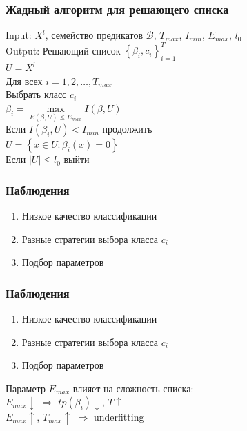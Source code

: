 \documentclass[12pt]{beamer}
\begin{document}
\begin{frame}\frametitle{Жадный алгоритм для решающего списка}
Input: $X^l$, семейство предикатов $\mathcal{B}$, $T_{max}$, $I_{min}$, $E_{max}$, $l_0$\\
Output: Решающий список $\left\{ \beta_i, c_i \right\}_{i=1}^T$\\
\vspace{5mm}
$U = X^l$\\
Для всех $i = 1,2,\dots,T_{max}$\\
\hspace{10mm} Выбрать класс $c_i$\\
\hspace{10mm} $\beta_i = \max\limits_{E(\beta, U) \leq E_{max}} I(\beta, U)$\\
\hspace{10mm} Если $I(\beta_i, U) < I_{min}$ продолжить\\
\hspace{10mm} $U = \left\{ x \in U: \beta_i(x) = 0 \right\}$\\
\hspace{10mm} Если $\vert U \vert \leq l_0$ выйти
\end{frame}

\begin{frame}\frametitle{Наблюдения}
\begin{enumerate}[--]
\item Низкое качество классификации
\item Разные стратегии выбора класса $c_i$
\item Подбор параметров
\end{enumerate}
\end{frame}

\begin{frame}\frametitle{Наблюдения}
\begin{enumerate}[--]
\item Низкое качество классификации
\item Разные стратегии выбора класса $c_i$
\item Подбор параметров
\end{enumerate}
\vspace{5mm}
Параметр $E_{max}$ влияет на сложность списка:\\
$E_{max} \downarrow$ $\Rightarrow$ $tp(\beta_i) \downarrow$, $T \uparrow$\\
$E_{max} \uparrow$, $T_{max} \uparrow$ $\Rightarrow$ underfitting
\end{frame}
\end{document}
